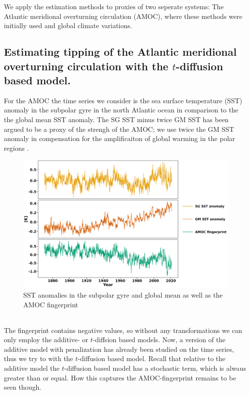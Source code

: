 We apply the estimation methods to proxies of two seperate systems: The Atlantic meridional overturning circulation (AMOC), where these methods were initially used \cite{Ditlevsen2023} and global climate variations.
\subsection{Estimating tipping of the Atlantic meridional overturning circulation with the $t$-diffusion based model.}
For the AMOC the time series we consider is the sea surface temperature (SST) anomaly in the subpolar gyre in the north Atlantic ocean in comparison to the the global mean SST anomaly. The SG SST minus twice GM SST has been argued to be a proxy of the strengh of the AMOC; we use twice the GM SST anomaly in compensation for the amplificaiton of global warming in the polar regions \cite[caption of figure 1]{Ditlevsen2023}.
\begin{figure}[h!]
    \begin{center}
    \includegraphics[scale = .075]{figures/AMOC_data_plot.jpeg}
    \caption{SST anomalies in the subpolar gyre and global mean as well as the AMOC fingerprint}
    \label{figure:AMOC_plot}
    \end{center}
\end{figure}\\
The fingerprint contains negative values, so without any transformations we can only employ the additive- or $t$-diffsion based models. Now, a version of the additive model with penalization has already been studied on the time series, thus we try to with the $t$-diffusion based model. Recall that relative to the additive model the $t$-diffusion based model has a stochastic term, which is alwaus greater than or equal. How this captures the AMOC-fingerprint remains to be seen though.
